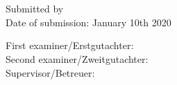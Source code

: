 \thispagestyle{empty}

\noindent\myTitle \\
\noindent\myDegree \\

\bigskip

\noindent Submitted by \myName \\
\noindent Date of submission: January 10th 2020

\bigskip

\noindent  First examiner/Erstgutachter: \myProf \\
\noindent Second examiner/Zweitgutachter: \myOtherProf \\
\noindent Supervisor/Betreuer: \mySupervisor \\

\hfill

\vfill

\noindent \myUni \\
\noindent \myDepartment \\
\noindent \myFaculty \\


%
%
%
%
%
